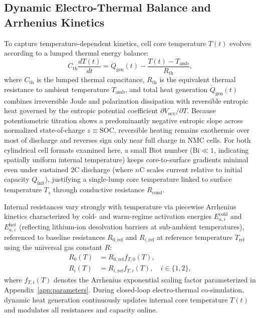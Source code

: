 \documentclass[11pt,a4paper]{article}
\begin{document}
\subsection{Dynamic Electro-Thermal Balance and Arrhenius Kinetics}
To capture temperature-dependent kinetics, cell core temperature $T(t)$ evolves according to a lumped thermal energy balance:
\begin{equation}\label{eqn:thermal_balance}
C_{\text{th}} \frac{d T(t)}{dt} = \dot{Q}_{\text{gen}}(t) - \frac{T(t) - T_{\text{amb}}}{R_{\text{th}}},
\end{equation}
where $C_{\text{th}}$ is the lumped thermal capacitance, $R_{\text{th}}$ is the equivalent thermal resistance to ambient temperature $T_{\text{amb}}$, and total heat generation $\dot{Q}_{\text{gen}}(t)$ combines irreversible Joule and polarization dissipation with reversible entropic heat governed by the entropic potential coefficient $\partial V_{\text{ocv}}/\partial T$. Because potentiometric titration shows a predominantly negative entropic slope across normalized state-of-charge $z \equiv \text{SOC}$, reversible heating remains exothermic over most of discharge and reverses sign only near full charge in NMC cells. For both cylindrical cell formats examined here, a small Biot number ($\text{Bi} \ll 1$, indicating spatially uniform internal temperature) keeps core-to-surface gradients minimal even under sustained $2\text{C}$ discharge (where $n\text{C}$ scales current relative to initial capacity $Q_{\text{init}}$), justifying a single-lump core temperature linked to surface temperature $T_s$ through conductive resistance $R_{\text{cond}}$.

Internal resistances vary strongly with temperature via piecewise Arrhenius kinetics characterized by cold- and warm-regime activation energies $E_{a,i}^{\text{cold}}$ and $E_{a,i}^{\text{hot}}$ (reflecting lithium-ion desolvation barriers at sub-ambient temperatures), referenced to baseline resistances $R_{0,\text{ref}}$ and $R_{i,\text{ref}}$ at reference temperature $T_{\text{ref}}$ using the universal gas constant $R$:
\begin{align}
R_0(T) &= R_{0,\text{ref}} f_{T,0}(T), \label{eqn:arrh_r0}\\
R_i(T) &= R_{i,\text{ref}} f_{T,i}(T), \quad i \in \{1, 2\}, \label{eqn:arrh_ri}
\end{align}
where $f_{T,i}(T)$ denotes the Arrhenius exponential scaling factor parameterized in Appendix~\ref{app:parameters}. During closed-loop electro-thermal co-simulation, dynamic heat generation continuously updates internal core temperature $T(t)$ and modulates all resistances and capacity online.
\end{document}
